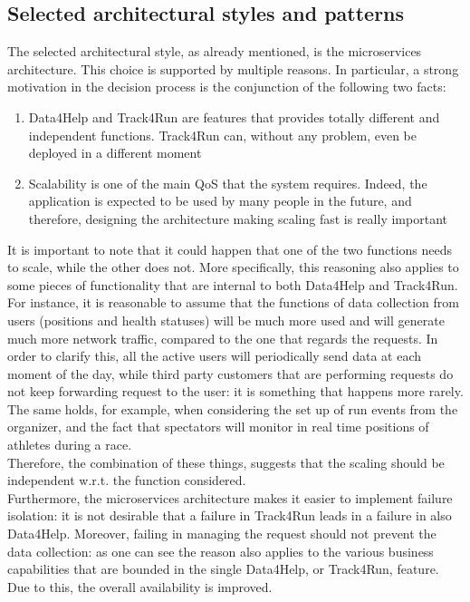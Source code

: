 \subsection{Selected architectural styles and patterns}
The selected architectural style, as already mentioned, is the microservices architecture. This choice is
supported by multiple reasons. In particular, a strong motivation in the decision process is the
conjunction of the following two facts:
\begin{enumerate}
\item Data4Help and Track4Run are features that provides totally different and independent functions.
Track4Run can, without any problem, even be deployed in a different moment
\item Scalability is one of the main QoS that the system requires. Indeed, the application is expected to
be used by many people in the future, and therefore, designing the architecture making scaling fast is
really important
\end{enumerate}
It is important to note that it could happen that one of the two functions needs to scale, while
the other does not. 
More specifically, this reasoning also applies to some pieces of functionality that
are internal to both Data4Help and Track4Run. 
For instance, it is reasonable to assume that the functions of data collection from users (positions and
health statuses) will be much more used and will generate much more network traffic, compared to the one
that regards the requests. 
In order to clarify this, all the active users will periodically send data at each moment of the day,
while third party customers that are performing requests do not keep forwarding request to the user: it is
something that happens more rarely. 
The same holds, for example, when considering the set up of run events from the organizer, and the fact
that spectators will monitor in real time positions of athletes during a race. \\ 
Therefore, the combination of these things, suggests that the scaling should be independent w.r.t. the
function considered. \\
Furthermore, the microservices architecture makes it easier to implement failure isolation: it is not
desirable that a failure in Track4Run leads in a failure in also Data4Help. 
Moreover, failing in managing the request should not prevent the data collection: as one can see the
reason also applies to the various business capabilities that are bounded in the single Data4Help, or
Track4Run, feature.  
Due to this, the overall availability is improved. 

